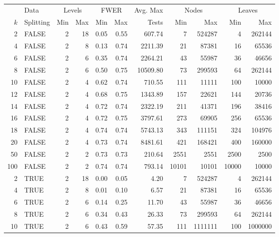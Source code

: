 \begin{table}[ht]
\centering
\begin{tabular}{rlrrrrrrrrr}
  \toprule
  &Data&\multicolumn{2}{c}{Levels} &\multicolumn{2}{c}{FWER} & Avg. Max &
  \multicolumn{2}{c}{Nodes} & \multicolumn{2}{c}{Leaves}\\ $k$ & Splitting & Min & Max & Min & Max & Tests & Min & Max & Min & Max \\ \midrule
  2 & FALSE &   2 &  18 & 0.05 & 0.55 & 607.74 &   7 & 524287 &   4 & 262144 \\ 
    4 & FALSE &   2 &   8 & 0.13 & 0.74 & 2211.39 &  21 & 87381 &  16 & 65536 \\ 
    6 & FALSE &   2 &   6 & 0.35 & 0.74 & 2264.21 &  43 & 55987 &  36 & 46656 \\ 
    8 & FALSE &   2 &   6 & 0.50 & 0.75 & 10509.80 &  73 & 299593 &  64 & 262144 \\ 
   10 & FALSE &   2 &   4 & 0.62 & 0.74 & 710.55 & 111 & 11111 & 100 & 10000 \\ 
   12 & FALSE &   2 &   4 & 0.68 & 0.75 & 1343.89 & 157 & 22621 & 144 & 20736 \\ 
   14 & FALSE &   2 &   4 & 0.72 & 0.74 & 2322.19 & 211 & 41371 & 196 & 38416 \\ 
   16 & FALSE &   2 &   4 & 0.72 & 0.75 & 3797.61 & 273 & 69905 & 256 & 65536 \\ 
   18 & FALSE &   2 &   4 & 0.74 & 0.74 & 5743.13 & 343 & 111151 & 324 & 104976 \\ 
   20 & FALSE &   2 &   4 & 0.73 & 0.74 & 8481.61 & 421 & 168421 & 400 & 160000 \\ 
   50 & FALSE &   2 &   2 & 0.73 & 0.73 & 210.64 & 2551 & 2551 & 2500 & 2500 \\ 
  100 & FALSE &   2 &   2 & 0.74 & 0.74 & 793.14 & 10101 & 10101 & 10000 & 10000 \\ 
    2 & TRUE &   2 &  18 & 0.00 & 0.05 & 4.20 &   7 & 524287 &   4 & 262144 \\ 
    4 & TRUE &   2 &   8 & 0.01 & 0.10 & 6.57 &  21 & 87381 &  16 & 65536 \\ 
    6 & TRUE &   2 &   6 & 0.14 & 0.25 & 11.70 &  43 & 55987 &  36 & 46656 \\ 
    8 & TRUE &   2 &   6 & 0.34 & 0.43 & 26.33 &  73 & 299593 &  64 & 262144 \\ 
   10 & TRUE &   2 &   6 & 0.43 & 0.59 & 57.35 & 111 & 1111111 & 100 & 1000000 \\ 

\end{tabular}
\end{table}
